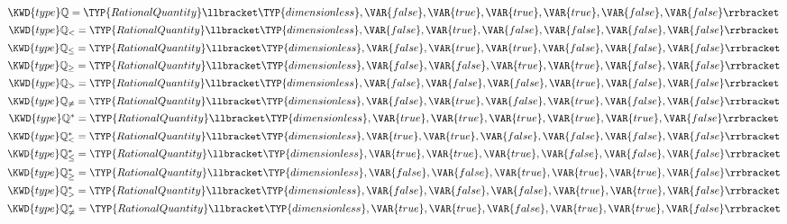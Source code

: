 \begin{Fortress}
\(\KWD{type} \mathbb{Q} = \TYP{RationalQuantity}\llbracket\mathbin{\TYP{dimensionless}},\VAR{false},\VAR{true},\VAR{true},\VAR{true},\VAR{false},\VAR{false}\rrbracket\)\\
\(\KWD{type} \mathbb{Q}_{<} = \TYP{RationalQuantity}\llbracket\mathbin{\TYP{dimensionless}},\VAR{false},\VAR{true},\VAR{false},\VAR{false},\VAR{false},\VAR{false}\rrbracket\)\\
\(\KWD{type} \mathbb{Q}_{\leq} = \TYP{RationalQuantity}\llbracket\mathbin{\TYP{dimensionless}},\VAR{false},\VAR{true},\VAR{true},\VAR{false},\VAR{false},\VAR{false}\rrbracket\)\\
\(\KWD{type} \mathbb{Q}_{\geq} = \TYP{RationalQuantity}\llbracket\mathbin{\TYP{dimensionless}},\VAR{false},\VAR{false},\VAR{true},\VAR{true},\VAR{false},\VAR{false}\rrbracket\)\\
\(\KWD{type} \mathbb{Q}_{>} = \TYP{RationalQuantity}\llbracket\mathbin{\TYP{dimensionless}},\VAR{false},\VAR{false},\VAR{false},\VAR{true},\VAR{false},\VAR{false}\rrbracket\)\\
\(\KWD{type} \mathbb{Q}_{\neq} = \TYP{RationalQuantity}\llbracket\mathbin{\TYP{dimensionless}},\VAR{false},\VAR{true},\VAR{false},\VAR{true},\VAR{false},\VAR{false}\rrbracket\)\\
\(\KWD{type} \mathbb{Q}^* = \TYP{RationalQuantity}\llbracket\mathbin{\TYP{dimensionless}},\VAR{true},\VAR{true},\VAR{true},\VAR{true},\VAR{true},\VAR{false}\rrbracket\)\\
\(\KWD{type} \mathbb{Q}^*_{<} = \TYP{RationalQuantity}\llbracket\mathbin{\TYP{dimensionless}},\VAR{true},\VAR{true},\VAR{false},\VAR{false},\VAR{false},\VAR{false}\rrbracket\)\\
\(\KWD{type} \mathbb{Q}^*_{\leq} = \TYP{RationalQuantity}\llbracket\mathbin{\TYP{dimensionless}},\VAR{true},\VAR{true},\VAR{true},\VAR{false},\VAR{false},\VAR{false}\rrbracket\)\\
\(\KWD{type} \mathbb{Q}^*_{\geq} = \TYP{RationalQuantity}\llbracket\mathbin{\TYP{dimensionless}},\VAR{false},\VAR{false},\VAR{true},\VAR{true},\VAR{true},\VAR{false}\rrbracket\)\\
\(\KWD{type} \mathbb{Q}^*_{>} = \TYP{RationalQuantity}\llbracket\mathbin{\TYP{dimensionless}},\VAR{false},\VAR{false},\VAR{false},\VAR{true},\VAR{true},\VAR{false}\rrbracket\)\\
\(\KWD{type} \mathbb{Q}^*_{\neq} = \TYP{RationalQuantity}\llbracket\mathbin{\TYP{dimensionless}},\VAR{true},\VAR{true},\VAR{false},\VAR{true},\VAR{true},\VAR{false}\rrbracket\)\\

\end{Fortress}
